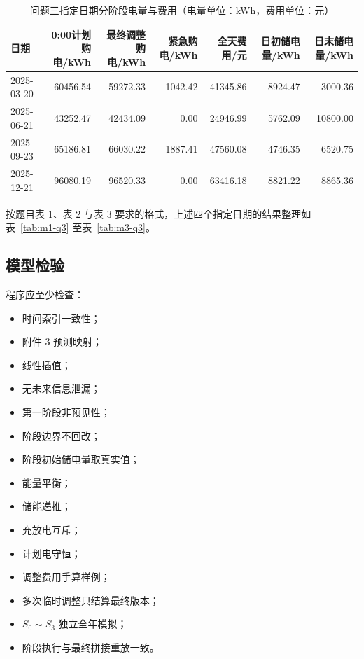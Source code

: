 \begin{table}[H]
\centering
{}
\begin{tabular}{lrrrrrr}
\toprule
日期 & 0:00计划购电/kWh & 最终调整购电/kWh & 紧急购电/kWh & 全天费用/元 & 日初储电量/kWh & 日末储电量/kWh \\
\midrule
2025-03-20 & 60456.54 & 59272.33 & 1042.42 & 41345.86 & 8924.47 & 3000.36 \\
2025-06-21 & 43252.47 & 42434.09 & 0.00 & 24946.99 & 5762.09 & 10800.00 \\
2025-09-23 & 65186.81 & 66030.22 & 1887.41 & 47560.08 & 4746.35 & 6520.75 \\
2025-12-21 & 96080.19 & 96520.33 & 0.00 & 63416.18 & 8821.22 & 8865.36 \\
\bottomrule
\end{tabular}
\caption{问题三指定日期分阶段电量与费用（电量单位：kWh，费用单位：元）}
\label{tab:9}
\end{table}

按题目表 1、表 2 与表 3 要求的格式，上述四个指定日期的结果整理如表~\ref{tab:m1-q3} 至表~\ref{tab:m3-q3}。









\subsection{模型检验}

程序应至少检查：

\begin{itemize}
\item 时间索引一致性；
\item 附件 3 预测映射；
\item 线性插值；
\item 无未来信息泄漏；
\item 第一阶段非预见性；
\item 阶段边界不回改；
\item 阶段初始储电量取真实值；
\item 能量平衡；
\item 储能递推；
\item 充放电互斥；
\item 计划电守恒；
\item 调整费用手算样例；
\item 多次临时调整只结算最终版本；
\item \(S_0\sim S_3\) 独立全年模拟；
\item 阶段执行与最终拼接重放一致。
\end{itemize}

